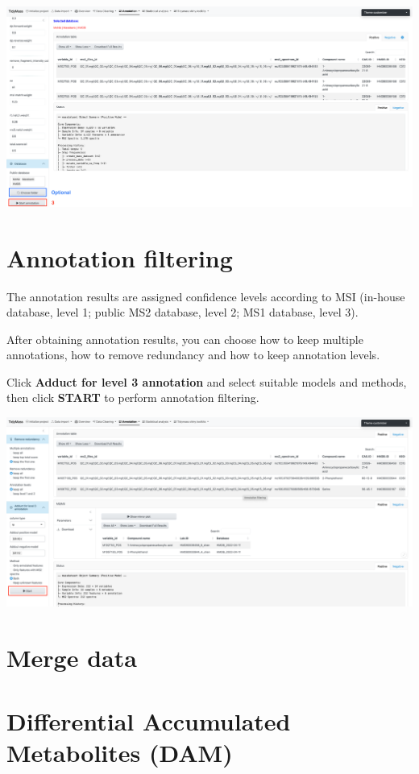 \documentclass[
]{book}
\begin{document}
\includegraphics{figures/metabolite_annotation2.png}

\section{Annotation filtering}\label{annotation-filtering}

The annotation results are assigned conﬁdence levels according to MSI (in-house database, level 1; public MS2 database, level 2; MS1 database, level 3).

After obtaining annotation results, you can choose how to keep multiple annotations, how to remove redundancy and how to keep annotation levels.

Click \textbf{Adduct for level 3 annotation} and select suitable models and methods, then click \textbf{START} to perform annotation filtering.

\includegraphics{figures/annotation_filtering.png}

\section{Merge data}\label{merge-data}

\section{Differential Accumulated Metabolites (DAM)}\label{differential-accumulated-metabolites-dam}
\end{document}
